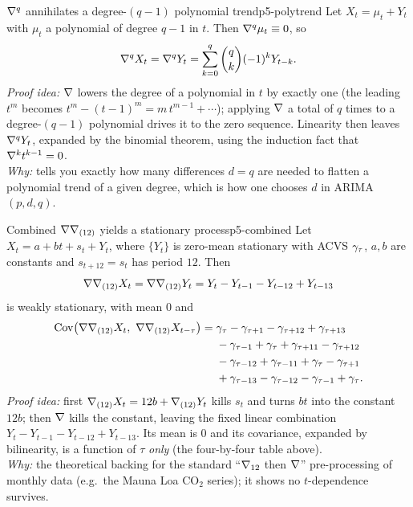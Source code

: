 \begin{proposition}{$\nabla^{q}$ annihilates a degree-$(q-1)$ polynomial trend}{p5-polytrend}
Let $X_t=\mu_t+Y_t$ with $\mu_t$ a polynomial of degree $q-1$ in $t$. Then
$\nabla^{q}\mu_t\equiv 0$, so
\[
\nabla^{q}X_t=\nabla^{q}Y_t=\sum_{k=0}^{q}\binom{q}{k}(-1)^{k}Y_{t-k}.
\]
\textit{Proof idea:} $\nabla$ lowers the degree of a polynomial in $t$ by exactly
one (the leading $t^{m}$ becomes $t^{m}-(t-1)^{m}=m\,t^{m-1}+\cdots$); applying
$\nabla$ a total of $q$ times to a degree-$(q-1)$ polynomial drives it to the
zero sequence. Linearity then leaves $\nabla^{q}Y_t$, expanded by the binomial
theorem, using the induction fact that $\nabla^{k}t^{k-1}=0$.\\
\textit{Why:} tells you exactly how many differences $d=q$ are needed to flatten
a polynomial trend of a given degree, which is how one chooses $d$ in
ARIMA$(p,d,q)$.
\end{proposition}

\begin{theorem}{Combined $\nabla\nabla_{(12)}$ yields a stationary process}{p5-combined}
Let $X_t=a+bt+s_t+Y_t$, where $\{Y_t\}$ is zero-mean stationary with ACVS
$\gamma_\tau$, $a,b$ are constants and $s_{t+12}=s_t$ has period $12$. Then
\[
\nabla\nabla_{(12)}X_t=\nabla\nabla_{(12)}Y_t
=Y_t-Y_{t-1}-Y_{t-12}+Y_{t-13}
\]
is weakly stationary, with mean $0$ and
\[
\begin{aligned}
\operatorname{Cov}\bigl(\nabla\nabla_{(12)}X_t,\ \nabla\nabla_{(12)}X_{t-\tau}\bigr)
=\;&\gamma_\tau-\gamma_{\tau+1}-\gamma_{\tau+12}+\gamma_{\tau+13}\\
&-\gamma_{\tau-1}+\gamma_{\tau}+\gamma_{\tau+11}-\gamma_{\tau+12}\\
&-\gamma_{\tau-12}+\gamma_{\tau-11}+\gamma_{\tau}-\gamma_{\tau+1}\\
&+\gamma_{\tau-13}-\gamma_{\tau-12}-\gamma_{\tau-1}+\gamma_{\tau} .
\end{aligned}
\]
\textit{Proof idea:} first $\nabla_{(12)}X_t=12b+\nabla_{(12)}Y_t$ kills $s_t$ and
turns $bt$ into the constant $12b$; then $\nabla$ kills the constant, leaving the
fixed linear combination $Y_t-Y_{t-1}-Y_{t-12}+Y_{t-13}$. Its mean is $0$ and
its covariance, expanded by bilinearity, is a function of $\tau$ \emph{only}
(the four-by-four table above).\\
\textit{Why:} the theoretical backing for the standard ``$\nabla_{12}$ then
$\nabla$'' pre-processing of monthly data (e.g.\ the Mauna Loa $\mathrm{CO}_2$
series); it shows no $t$-dependence survives.
\end{theorem}

